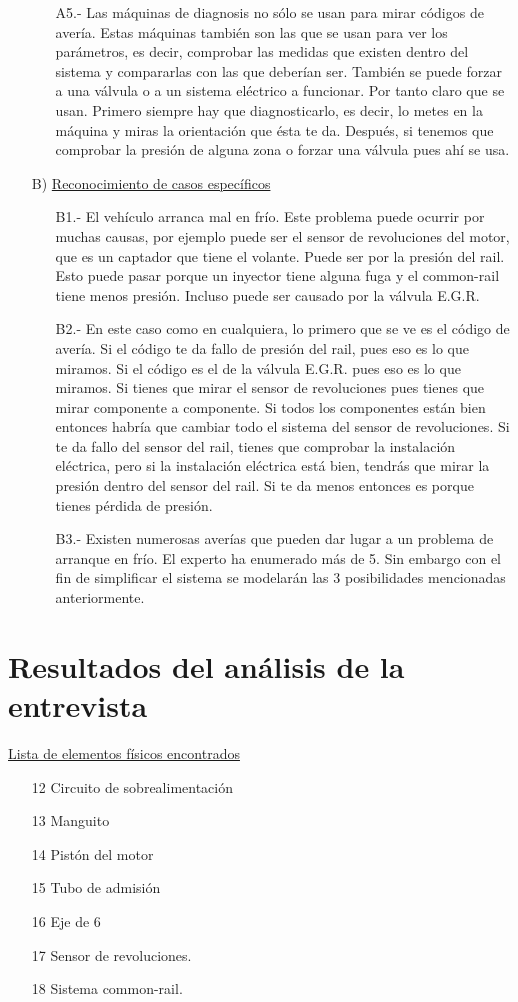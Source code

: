 \documentclass[a4paper,12pt]{article}
\begin{document}
\begin{itemize}
\begin{itemize}
\item[A5.-] Las máquinas de diagnosis no sólo se usan para mirar códigos de avería. Estas máquinas también son las que se usan para ver los parámetros, es decir, comprobar las medidas que existen dentro del sistema y compararlas con las que deberían ser. También se puede forzar a una válvula o a un sistema eléctrico a funcionar. Por tanto claro que se usan. Primero siempre hay que diagnosticarlo, es decir, lo metes en la máquina y miras la orientación que ésta te da. Después, si tenemos que comprobar la presión de alguna zona o forzar una válvula pues ahí se usa.
\end{itemize}
\item[B)] \underline{Reconocimiento de casos específicos}
\begin{itemize}
\item[B1.-] El vehículo arranca mal en frío. Este problema puede ocurrir por muchas causas, por ejemplo puede ser el sensor de revoluciones del motor, que es un captador que tiene el volante. Puede ser por la presión del rail. Esto puede pasar porque un inyector tiene alguna fuga y el common-rail tiene menos presión. Incluso puede ser causado por la válvula E.G.R.
\item[B2.-] En este caso como en cualquiera, lo primero que se ve es el código de avería. Si el código te da fallo de presión del rail, pues eso es lo que miramos. Si el código es el de la válvula E.G.R. pues eso es lo que miramos. Si tienes que mirar el sensor de revoluciones pues tienes que mirar componente a componente. Si todos los componentes están bien entonces habría que cambiar todo el sistema del sensor de revoluciones. Si te da fallo del sensor del rail, tienes que comprobar la instalación eléctrica, pero si la instalación eléctrica está bien, tendrás que mirar la presión dentro del sensor del rail. Si te da menos entonces es porque tienes pérdida de presión.
\item[B3.-] Existen numerosas averías que pueden dar lugar a un problema de arranque en frío. El experto ha enumerado más de 5. Sin embargo con el fin de simplificar el sistema se modelarán las 3 posibilidades mencionadas anteriormente.
\end{itemize}
\end{itemize}

\section{Resultados del análisis de la entrevista}
\underline{Lista de elementos físicos encontrados}
\begin{itemize}
\item[12] Circuito de sobrealimentación
\item[13] Manguito
\item[14] Pistón del motor
\item[15] Tubo de admisión
\item[16] Eje de 6
\item[17] Sensor de revoluciones.
\item[18] Sistema common-rail.
\end{itemize}
\end{document}
